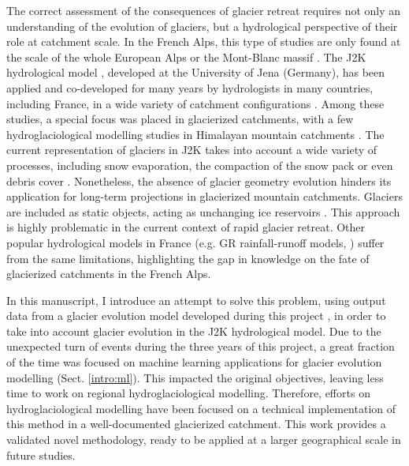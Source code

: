 The correct assessment of the consequences of glacier retreat requires not only an understanding of the evolution of glaciers, but a hydrological perspective of their role at catchment scale. In the French Alps, this type of studies are only found at the scale of the whole European Alps \citep{coppola_impact_2018} or the Mont-Blanc massif \citep{laurent_impact_2020}. The J2K hydrological model \citep{krause_quantifying_2002}, developed at the University of Jena (Germany), has been applied and co-developed for many years by hydrologists in many countries, including France, in a wide variety of catchment configurations \citep{branger_investigating_2012, braud_j2000-rhone_2017, horner_information_2020}. Among these studies, a special focus was placed in glacierized catchments, with a few hydroglaciological modelling studies in Himalayan mountain catchments \citep{gao_test_2012, nepal_understanding_2014}. The current representation of glaciers in J2K takes into account a wide variety of processes, including snow evaporation, the compaction of the snow pack or even debris cover \citep{nepal_understanding_2014}. Nonetheless, the absence of glacier geometry evolution hinders its application for long-term projections in glacierized mountain catchments. Glaciers are included as static objects, acting as unchanging ice reservoirs \citep{nepal_understanding_2014}. This approach is highly problematic in the current context of rapid glacier retreat.  Other popular hydrological models in France (e.g. GR rainfall-runoff models, \cite{coron_suite_2017}) suffer from the same limitations, highlighting the gap in knowledge on the fate of glacierized catchments in the French Alps. 

In this manuscript, I introduce an attempt to solve this problem, using output data from a glacier evolution model developed during this project \citep{bolibar_alpgm_2020}, in order to take into account glacier evolution in the J2K hydrological model. Due to the unexpected turn of events during the three years of this project, a great fraction of the time was focused on machine learning applications for glacier evolution modelling (Sect. \ref{intro:ml}). This impacted the original objectives, leaving less time to work on regional hydroglaciological modelling. Therefore, efforts on hydroglaciological modelling have been focused on a technical implementation of this method in a well-documented glacierized catchment. This work provides a validated novel methodology, ready to be applied at a larger geographical scale in future studies.

